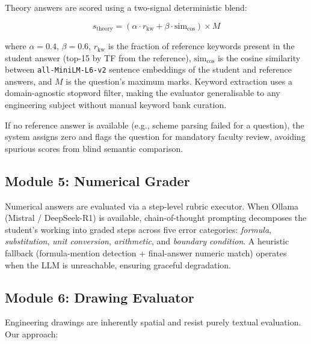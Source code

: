\documentclass[conference]{IEEEtran}
\begin{document}
Theory answers are scored using a two-signal deterministic blend:

\begin{equation}
    s_{\text{theory}} = \left(\alpha \cdot r_{\text{kw}} + \beta \cdot \text{sim}_{\cos}\right) \times M
    \label{eq:theory}
\end{equation}

where $\alpha = 0.4$, $\beta = 0.6$, $r_{\text{kw}}$ is the fraction of reference keywords present in the student answer (top-15 by TF from the reference), $\text{sim}_{\cos}$ is the cosine similarity between \texttt{all-MiniLM-L6-v2} sentence embeddings of the student and reference answers, and $M$ is the question's maximum marks. Keyword extraction uses a domain-agnostic stopword filter, making the evaluator generalisable to any engineering subject without manual keyword bank curation.

If no reference answer is available (e.g., scheme parsing failed for a question), the system assigns zero and flags the question for mandatory faculty review, avoiding spurious scores from blind semantic comparison.

\subsection{Module 5: Numerical Grader}
\label{ssec:numerical}

Numerical answers are evaluated via a step-level rubric executor. When Ollama (Mistral / DeepSeek-R1) is available, chain-of-thought prompting decomposes the student's working into graded steps across five error categories: \textit{formula}, \textit{substitution}, \textit{unit conversion}, \textit{arithmetic}, and \textit{boundary condition}. A heuristic fallback (formula-mention detection + final-answer numeric match) operates when the LLM is unreachable, ensuring graceful degradation.

\subsection{Module 6: Drawing Evaluator}
\label{ssec:drawing}

Engineering drawings are inherently spatial and resist purely textual evaluation. Our approach:
\end{document}
